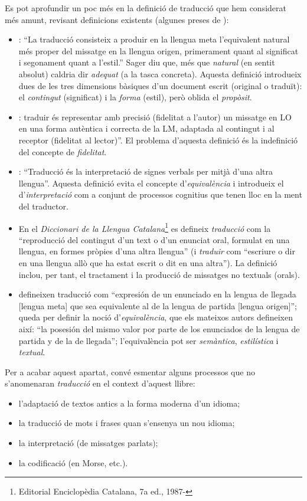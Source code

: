 Es pot aprofundir un poc més en la definició de traducció que hem
considerat més amunt, revisant definicions existents (algunes preses
de \citealt{sager93b}):
\begin{itemize}
\item \citet[p.~19]{nida59b}: ``La traducció consisteix a produir en
  la llengua meta l'equivalent natural més proper del missatge en la
  llengua origen, primerament quant al significat i segonament quant a
  l'estil.'' Sager diu que, més que \emph{natural} (en sentit absolut)
  caldria dir \emph{adequat} (a la tasca concreta). Aquesta definició
  introdueix dues de les tres dimensions bàsiques d'un document escrit
  (original o traduït): el \emph{contingut} (significat) i la
  \emph{forma} (estil), però oblida el \emph{propòsit}.
\item \citet{flamand83b}: traduir és representar amb precisió
  (fidelitat a l'autor) un missatge en LO en una forma autèntica i
  correcta de la LM, adaptada al contingut i al receptor (fidelitat al
  lector)''. El problema d'aquesta definició és la indefinició del
  concepte de \emph{fidelitat}.
\item \citet{jakobson66b}: ``Traducció és la interpretació de signes
  verbals per mitjà d'una altra llengua''. Aquesta definició evita el
  concepte d'\emph{equi\-va\-lèn\-cia} i introdueix el
  d'\emph{interpretació} com a conjunt de processos cognitius que
  tenen lloc en la ment del traductor.
\item En el \emph{Diccionari de la Llengua
    Catalana}\footnote{Editorial Enciclopèdia Catalana, 7a ed., 1987-}
  es defineix {\em traducció} com la ``reproducció del contingut d'un
  text o d'un enunciat oral, formulat en una llengua, en formes
  pròpies d'una altra llengua'' (i \emph{traduir} com ``escriure o dir
  en una llengua allò que ha estat escrit o dit en una altra''). La
  definició inclou, per tant, el tractament i la producció de
  missatges no textuals (orals).
\item \citet{alcaraz97b} defineixen traducció com ``expresión de un
  enunciado en la lengua de llegada [lengua meta] que sea equivalente
  al de la lengua de partida [lengua origen]''; queda per definir la
  noció d'\emph{equivalència}, que els mateixos autors defineixen
  així: ``la posesión del mismo valor por parte de los enunciados de
  la lengua de partida y de la de llegada''; l'equivalència pot ser
  {\em semàntica}, \emph{estilística} i \emph{textual}.
\end{itemize}

Per a acabar aquest apartat, convé esmentar alguns processos que no
s'anomenaran \emph{traducció} en el context d'aquest llibre:
\begin{itemize}
\item l'adaptació de textos antics a la forma moderna d'un idioma;
\item la traducció de mots i frases quan s'ensenya un nou idioma;
\item la interpretació (de missatges parlats);
\item la codificació (en Morse, etc.).
\end{itemize}

